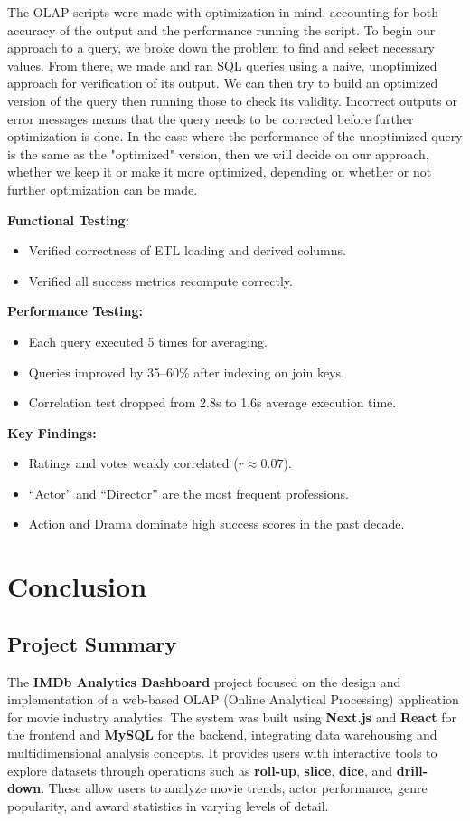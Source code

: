 \documentclass[sigconf, pbalance]{acmart}
\begin{document}
The OLAP scripts were made with optimization in mind, accounting for both accuracy of the output and the performance running the script. To begin our approach to a query, we broke down the problem to find and select necessary values. From there, we made and ran SQL queries using a naive, unoptimized approach for verification of its output. We can then try to build an optimized version of the query then running those to check its validity. Incorrect outputs or error messages means that the query needs to be corrected before further optimization is done. In the case where the performance of the unoptimized query is the same as the "optimized" version, then we will decide on our approach, whether we keep it or make it more optimized, depending on whether or not further optimization can be made.

\textbf{Functional Testing:}
\begin{itemize}
    \item Verified correctness of ETL loading and derived columns.
    \item Verified all success metrics recompute correctly.
\end{itemize}

\textbf{Performance Testing:}
\begin{itemize}
    \item Each query executed 5 times for averaging.
    \item Queries improved by 35--60\% after indexing on join keys.
    \item Correlation test dropped from 2.8s to 1.6s average execution time.
\end{itemize}

\textbf{Key Findings:}
\begin{itemize}
    \item Ratings and votes weakly correlated ($r \approx 0.07$).
    \item ``Actor'' and ``Director'' are the most frequent professions.
    \item Action and Drama dominate high success scores in the past decade.
\end{itemize}

\section{Conclusion}

\subsection{Project Summary}
The \textbf{IMDb Analytics Dashboard} project focused on the design and implementation of a web-based OLAP (Online Analytical Processing) application for movie industry analytics. The system was built using \textbf{Next.js} and \textbf{React} for the frontend and \textbf{MySQL} for the backend, integrating data warehousing and multidimensional analysis concepts. It provides users with interactive tools to explore datasets through operations such as \textbf{roll-up}, \textbf{slice}, \textbf{dice}, and \textbf{drill-down}. These allow users to analyze movie trends, actor performance, genre popularity, and award statistics in varying levels of detail. 
\end{document}
